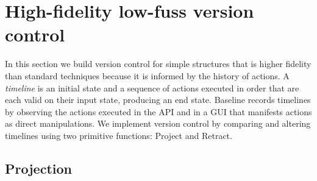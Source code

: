 \documentclass[english,submission]{programming}
\theoremstyle{definition}
\begin{document}
\section{High-fidelity low-fuss version control}
In this section we build version control for simple structures that is higher fidelity than standard techniques because it is informed by the history of actions. A \textit{timeline} is an initial state and a sequence of actions executed in order that are each valid on their input state, producing an end state. Baseline records timelines by observing the actions executed in the API and in a GUI that manifests actions as direct manipulations.
We implement version control by comparing and altering timelines using two primitive functions: \textsf{Project} and \textsf{Retract}.

\subsection{Projection}
\end{document}
